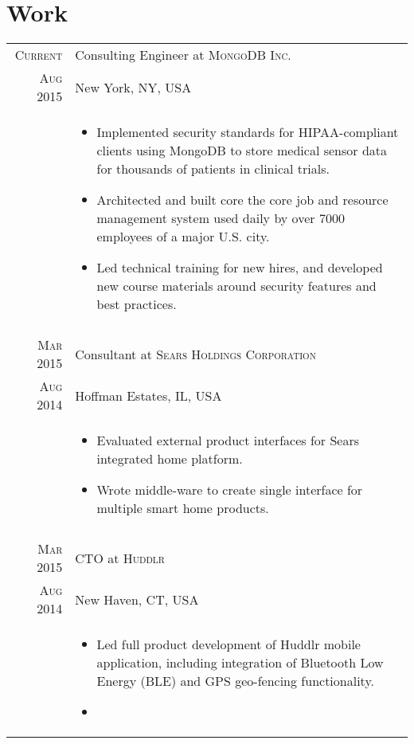 \documentclass[a4paper,10pt]{article}
\begin{document}
\section{Work}
\begin{longtable}{r|p{11cm}}
 \nopagebreak \textsc{Current} & Consulting Engineer at \textsc{MongoDB Inc.}\\
 \nopagebreak \textsc{Aug 2015} & \small{New York, NY, USA} \\
 \nopagebreak & \footnotesize{
	\begin{itemize}
		\item[]{
			Implemented security standards for HIPAA-compliant clients
			using MongoDB to store medical sensor data for thousands
			of patients in clinical trials.
		}
		\item[]{
			Architected and built core the core job and resource management system
			used daily by over 7000 employees of a major U.S. city.
		}
		\item[]{
			Led technical training for new hires, and developed new
			course materials around security features and best 
			practices.
		}
	\end{itemize}
   }\\
 \multicolumn{2}{c}{} \\
 \nopagebreak \textsc{Mar 2015} & Consultant at \textsc{Sears Holdings Corporation}\\
 \nopagebreak \textsc{Aug 2014} & \small{Hoffman Estates, IL, USA}\\
 \nopagebreak & \footnotesize{
	\begin{itemize}
		\item[]{
			Evaluated external product interfaces for Sears integrated home platform.
		}
		\item[]{
			Wrote middle-ware to create single interface for multiple smart home products.
		}
	\end{itemize}
   }\\
 \multicolumn{2}{c}{} \\
 \nopagebreak \textsc{Mar 2015} & CTO at \textsc{Huddlr}\\
 \nopagebreak \textsc{Aug 2014} & \small{New Haven, CT, USA}\\
 \nopagebreak & \footnotesize{
	\begin{itemize}
		\item[]{
			Led full product development of Huddlr mobile application, including
			integration of Bluetooth Low Energy (BLE) and GPS geo-fencing functionality.
		}
		\item[]{
}
\end{itemize}}
\end{longtable}
\end{document}
